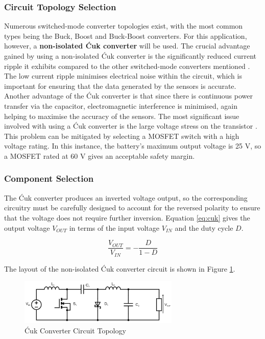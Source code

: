 \subsubsection{Circuit Topology Selection}

Numerous switched-mode converter topologies exist, with the most common types being the Buck, Boost and Buck-Boost converters. For this application, however, a \textbf{non-isolated Ćuk converter} will be used. The crucial advantage gained by using a non-isolated Ćuk converter is the significantly reduced current ripple it exhibits compared to the other switched-mode converters mentioned \cite{cuk1981dc-to-dc}. The low current ripple minimises electrical noise within the circuit, which is important for ensuring that the data generated by the sensors is accurate. Another advantage of the Ćuk converter is that since there is continuous power transfer via the capacitor, electromagnetic interference is minimised, again helping to maximise the accuracy of the sensors. The most significant issue involved with using a Ćuk converter is the large voltage stress on the transistor \cite{Bailey:1641409}. This problem can be mitigated by selecting a \gls{MOSFET} switch with a high voltage rating. In this instance, the battery's maximum output voltage is 25 V, so a \gls{MOSFET} rated at 60 V gives an acceptable safety margin.

\subsubsection{Component Selection}

The Ćuk converter produces an inverted voltage output, so the corresponding circuitry must be carefully designed to account for the reversed polarity to ensure that the voltage does not require further inversion. Equation \ref{eq:cuk} gives the output voltage $V_{OUT}$ in terms of the input voltage $V_{IN}$ and the duty cycle $D$.

\begin{equation}
  \frac{V_{OUT}}{V_{IN}} = - \frac{D}{1-D}
  \label{eq:cuk}
\end{equation}

The layout of the non-isolated Ćuk converter circuit is shown in Figure \ref{fig:cukdiagram}.

\begin{figure}[H]
  \centering
  \includegraphics[width=0.68\textwidth]{figs/Samuel/Figures/mosfet cuk (1).pdf}
  \caption{Ćuk Converter Circuit Topology}
  \label{fig:cukdiagram}
\end{figure}



